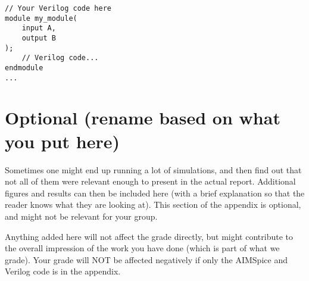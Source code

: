 \begin{lstlisting}[style=verilogStyle, caption=D Flip-Flop in Verilog, label=verilog_dflipflop]
// Your Verilog code here
module my_module(
    input A,
    output B
);
    // Verilog code...
endmodule
...
\end{lstlisting}


\section{Optional (rename based on what you put here)}
Sometimes one might end up running a lot of simulations, and then find out that not all of them were relevant enough to present in the actual report. Additional figures and results can then be included here (with a brief explanation so that the reader knows what they are looking at). This section of the appendix is optional, and might not be relevant for your group. 

Anything added here will not affect the grade directly, but might contribute to the overall impression of the work you have done (which is part of what we grade). Your grade will NOT be affected negatively if only the AIMSpice and Verilog code is in the appendix.